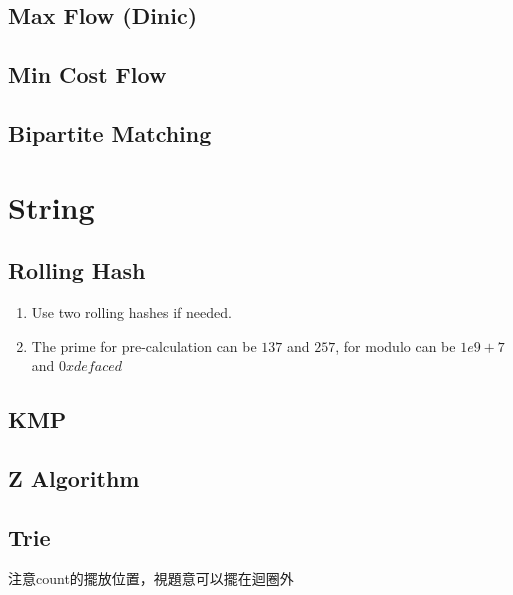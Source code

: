 \documentclass[10pt,oneside]{article}
\begin{document}
\begin{landscape}
\begin{multicols}{2}
\subsection{Max Flow (Dinic)}


\subsection{Min Cost Flow}


\subsection{Bipartite Matching}



\section{String}

\subsection{Rolling Hash}

\begin{enumerate}
	\item Use two rolling hashes if needed.  
	\item The prime for pre-calculation can be $137$ and $257$, for modulo can be $1e9 + 7$ and $0xdefaced$ 
\end{enumerate}



\subsection{KMP}



\subsection{Z Algorithm}

\subsection{Trie}
注意count的擺放位置，視題意可以擺在迴圈外



\end{multicols}
\end{landscape}
\end{document}
